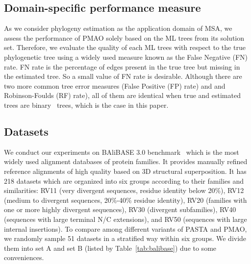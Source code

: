 \subsection{Domain-specific performance measure}
As we consider phylogeny estimation as the application domain of MSA, we assess the performance of PMAO solely based on the ML trees from its solution set. Therefore, we evaluate the quality of each ML trees with respect to the true phylogenetic tree
using a widely used measure known as the False Negative (FN) rate. FN rate is the percentage
 of edges present in the true tree but missing in the estimated tree. So a small value of FN rate
is desirable. Although there are two more common tree error measures (False Positive (FP) rate)
and and Robinson-Foulds (RF) rate), all of them are identical when true and estimated trees are
binary~\cite{warnow2017computational} trees, which is the case in this paper.


\subsection{Datasets}
We conduct our experiments on BAliBASE 3.0 benchmark~\cite{thompson2005balibase} which is the most widely used alignment databases of protein families. It
provides manually refined reference alignments of high quality based on 3D structural superposition.
It has 218 datasets which are organized into six groups according to their families and similarities: RV11
(very divergent sequences, residue identity below 20\%), RV12 (medium to divergent sequences, 20\%-40\% residue identity), RV20 (families with one or more highly divergent sequences), RV30 (divergent subfamilies), RV40 (sequences with large terminal N/C extensions), and RV50 (sequences
with large internal insertions). To compare among different variants of PASTA and PMAO, we randomly sample 51 datasets in a stratified way within six groups. We divide them into set A and set B (listed by Table~\ref{tab:balibase}) due to some conveniences.

